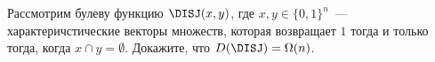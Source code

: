 Рассмотрим булеву функцию $\DISJ(x, y)$, где $x, y \in \{0, 1\}^n$~--- характеричстические векторы
множеств, которая возвращает $1$ тогда и только тогда, когда $x \cap y = \emptyset$. Докажите, что
$D(\DISJ) = \Omega(n)$.